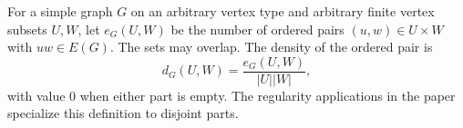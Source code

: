 \begin{definition}
For a simple graph $G$ on an arbitrary vertex type and arbitrary finite vertex subsets $U,W$, let $e_G(U,W)$ be the number of ordered pairs $(u,w)\in U\times W$ with $uw\in E(G)$.  The sets may overlap.  The density of the ordered pair is
\[
d_G(U,W)=\frac{e_G(U,W)}{|U||W|},
\]
with value $0$ when either part is empty.  The regularity applications in the paper specialize this definition to disjoint parts.
\end{definition}
